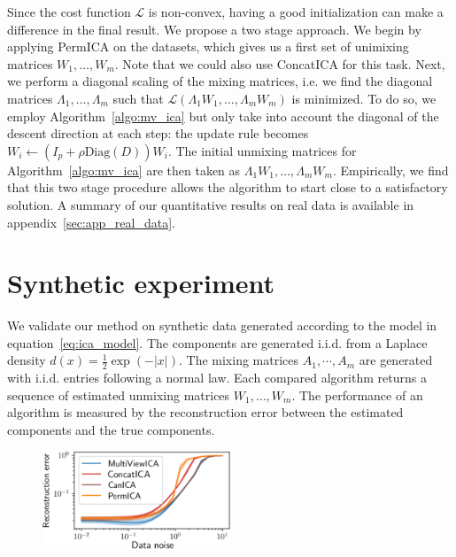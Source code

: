 Since the cost function $\mathcal{L}$ is non-convex, having a good initialization can make a difference in the final result. We propose a two stage approach.
We begin by applying PermICA on the datasets, which gives us a first set of unimixing matrices $W_1, \dots, W_m$.
Note that we could also use ConcatICA for this task.
Next, we perform a diagonal scaling of the mixing matrices, i.e. we find the diagonal matrices $\Lambda_1, \dots, \Lambda_m$ such that $\mathcal{L}(\Lambda_1W_1, \dots, \Lambda_mW_m)$ is minimized.
To do so, we employ Algorithm~\ref{algo:mv_ica} but only take into account the diagonal of the descent direction at each step: the update rule becomes $W_i \leftarrow (I_p + \rho \text{Diag}(D))W_i$.
The initial unmixing matrices for Algorithm~\ref{algo:mv_ica} are then taken as $\Lambda_1W_1, \dots, \Lambda_mW_m$.
Empirically, we find that this two stage procedure allows the algorithm to start close to a satisfactory solution.
A summary of our quantitative results on real data is available in appendix~\ref{sec:app_real_data}.


\section{Synthetic experiment}

We validate our method on synthetic data generated according to the model in equation~\eqref{eq:ica_model}.
%
The components are generated i.i.d. from a Laplace density $d(x)=\frac12\exp(-|x|)$.
%
The mixing matrices $A_1,\cdots, A_m$ are generated with i.i.d. entries following a normal law.
Each compared algorithm returns a sequence of estimated unmixing matrices $W_1, \dots, W_m$.
%
The performance of an algorithm is measured by the reconstruction error between the estimated components and the true components.

\begin{figure}
  \includegraphics[width=0.5\textwidth]{figures/mvica/distance_expe.pdf}
  \label{fig:mvica:synth}
\end{figure}


